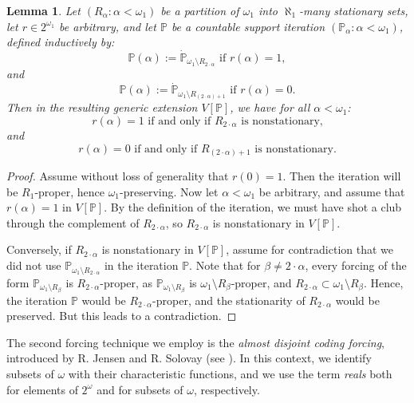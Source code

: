 \documentclass[a4paper,11pt]{article}
\newtheorem{lemma}[theorem]{Lemma}
\newcommand{\forceP}{\mathbb{P}}
\begin{document}
\begin{lemma}\label{coding with stationary sets}
Let \( (R_{\alpha} : \alpha < \omega_1) \) be a partition of \( \omega_1 \) into \( \aleph_1 \)-many stationary sets, let \( r \in 2^{\omega_1} \) be arbitrary, and let \( \forceP \) be a countable support iteration \( (\forceP_{\alpha} : \alpha < \omega_1) \), defined inductively by:
\[
\forceP(\alpha) := \dot{\forceP}_{\omega_1 \setminus R_{2 \cdot \alpha}} \text{ if } r(\alpha) = 1,
\]
and
\[
\forceP(\alpha) := \dot{\forceP}_{\omega_1 \setminus R_{(2 \cdot \alpha) + 1}} \text{ if } r(\alpha) = 0.
\]
Then in the resulting generic extension \( V[\forceP] \), we have for all \( \alpha < \omega_1 \):
\[
r(\alpha) = 1 \text{ if and only if } R_{2 \cdot \alpha} \text{ is nonstationary,}
\]
and
\[
r(\alpha) = 0 \text{ if and only if } R_{(2 \cdot \alpha) + 1} \text{ is nonstationary.}
\]
\end{lemma}

\begin{proof}
Assume without loss of generality that \( r(0) = 1 \). Then the iteration will be \( R_1 \)-proper, hence \( \omega_1 \)-preserving. Now let \( \alpha < \omega_1 \) be arbitrary, and assume that \( r(\alpha) = 1 \) in \( V[\forceP] \). By the definition of the iteration, we must have shot a club through the complement of \( R_{2 \cdot \alpha} \), so \( R_{2 \cdot \alpha} \) is nonstationary in \( V[\forceP] \).

Conversely, if \( R_{2 \cdot \alpha} \) is nonstationary in \( V[\forceP] \), assume for contradiction that we did not use \( \forceP_{\omega_1 \setminus R_{2 \cdot \alpha}} \) in the iteration \( \forceP \). Note that for \( \beta \neq 2 \cdot \alpha \), every forcing of the form \( \forceP_{\omega_1 \setminus R_{\beta}} \) is \( R_{2 \cdot \alpha} \)-proper, as \( \forceP_{\omega_1 \setminus R_{\beta}} \) is \( \omega_1 \setminus R_{\beta} \)-proper, and \( R_{2 \cdot \alpha} \subset \omega_1 \setminus R_{\beta} \). Hence, the iteration \( \forceP \) would be \( R_{2 \cdot \alpha} \)-proper, and the stationarity of \( R_{2 \cdot \alpha} \) would be preserved. But this leads to a contradiction.
\end{proof}


The second forcing technique we employ is the \emph{almost disjoint coding forcing}, introduced by R. Jensen and R. Solovay (see \cite{JensenSolovay}). In this context, we identify subsets of \( \omega \) with their characteristic functions, and we use the term \emph{reals} both for elements of \( 2^\omega \) and for subsets of \( \omega \), respectively.
\end{document}
